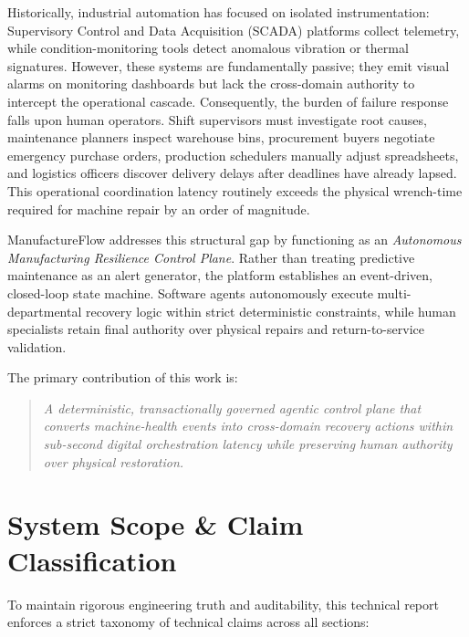 \documentclass[10pt,twocolumn,a4paper]{article}
\begin{document}
Historically, industrial automation has focused on isolated instrumentation: Supervisory Control and Data Acquisition (SCADA) platforms collect telemetry, while condition-monitoring tools detect anomalous vibration or thermal signatures. However, these systems are fundamentally passive; they emit visual alarms on monitoring dashboards but lack the cross-domain authority to intercept the operational cascade. Consequently, the burden of failure response falls upon human operators. Shift supervisors must investigate root causes, maintenance planners inspect warehouse bins, procurement buyers negotiate emergency purchase orders, production schedulers manually adjust spreadsheets, and logistics officers discover delivery delays after deadlines have already lapsed. This operational coordination latency routinely exceeds the physical wrench-time required for machine repair by an order of magnitude.

ManufactureFlow addresses this structural gap by functioning as an \textit{Autonomous Manufacturing Resilience Control Plane}. Rather than treating predictive maintenance as an alert generator, the platform establishes an event-driven, closed-loop state machine. Software agents autonomously execute multi-departmental recovery logic within strict deterministic constraints, while human specialists retain final authority over physical repairs and return-to-service validation.

The primary contribution of this work is:
\begin{quote}
\textit{A deterministic, transactionally governed agentic control plane that converts machine-health events into cross-domain recovery actions within sub-second digital orchestration latency while preserving human authority over physical restoration.}
\end{quote}

\section{System Scope \& Claim Classification}
\label{sec:scope}
To maintain rigorous engineering truth and auditability, this technical report enforces a strict taxonomy of technical claims across all sections:
\end{document}
